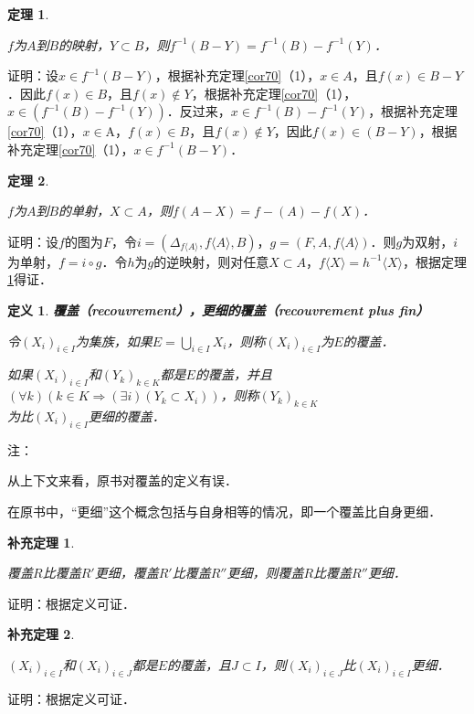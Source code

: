 \documentclass[12pt, a4paper, oneside]{book}
\newtheorem{theo}{定理}
\newtheorem{cor}{补充定理}
\newtheorem{de}{定义}
\begin{document}
			\begin{theo}\label{theo30}
				\hfill\par
				$f$为$A$到$B$的映射，$Y\subset B$，则$f^{-1}(B-Y)=f^{-1}(B)-f^{-1}(Y)$．
			\end{theo}
			证明：设$x\in f^{-1}(B-Y)$，根据补充定理\ref{cor70}（1），$x\in A$，且$f(x)\in B-Y$．因此$f(x)\in B$，且$f(x)\notin Y$，根据补充定理\ref{cor70}（1），$x\in(f^{-1}(B)-f^{-1}(Y))$．反过来，$x\in f^{-1}(B)-f^{-1}(Y)$，根据补充定理\ref{cor70}（1），$x\in $A，$f(x)\in B$，且$f(x)\notin Y$，因此$f(x)\in(B-Y)$，根据补充定理\ref{cor70}（1），$x\in f^{-1}(B-Y)$．
			
			\begin{theo}\label{theo31}
				\hfill\par
				$f$为$A$到$B$的单射，$X\subset A$，则$f(A-X)=f-(A)-f(X)$．
			\end{theo}
			证明：设$f$的图为$F$，令$i=(\Delta_{f\langle A \rangle }, f\langle A \rangle , B)$，$g=(F, A, f\langle A \rangle )$．则$g$为双射，$i$为单射，$f=i\circ g$．令$h$为$g$的逆映射，则对任意$X\subset A$，$f\langle X \rangle =h^{-1}\langle X \rangle $，根据定理\ref{theo30}得证．

			\begin{de}
				\textbf{覆盖（recouvrement），更细的覆盖（recouvrement plus fin）}
				\par
				令$(X_i)_{i\in I}$为集族，如果$E=\bigcup\limits_{i\in I}X_i$，则称$(X_i)_{i\in I}$为$E$的覆盖．
				\par
				如果$(X_i)_{i\in I}$和$(Y_k)_{k\in K}$都是$E$的覆盖，并且$(\forall k)(k\in K\Rightarrow (\exists i)(Y_k\subset X_i))$，则称$(Y_k)_{k\in K}$\\为比$(X_i)_{i\in I}$更细的覆盖．
			\end{de}
			注：
			\par
			从上下文来看，原书对覆盖的定义有误．
			\par
			在原书中，“更细”这个概念包括与自身相等的情况，即一个覆盖比自身更细．
			
			
			\begin{cor}\label{cor107}
				\hfill\par
				覆盖$R$比覆盖$R'$更细，覆盖$R'$比覆盖$R''$更细，则覆盖$R$比覆盖$R''$更细．
			\end{cor}
			证明：根据定义可证．

			\begin{cor}\label{cor108}
				\hfill\par
				$(X_i)_{i\in I}$和$(X_i)_{i\in J}$都是$E$的覆盖，且$J\subset I$，则$(X_i)_{i\in J}$比$(X_i)_{i\in I}$更细．
			\end{cor}
			证明：根据定义可证．
						
\end{document}
